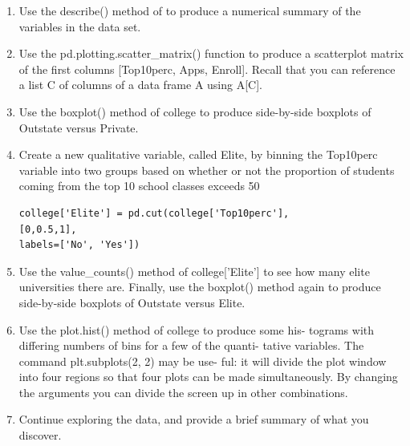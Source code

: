 \begin{exercise}[2.8]
\begin{enumerate}[label=(\alph*)]
		pandas to treat this as data. However, it may be handy to have
		these names for later. Try the following commands and similarly
		look at the resulting data frames:
		\begin{lstlisting}[language=Python]
college2 = pd.read_csv('College.csv', index_col=0)
college3 = college.rename({'Unnamed: 0': 'College'},
													axis=1)
college3 = college3.set_index('College')
	\end{lstlisting}		
This has used the first column in the file as an index for the
data frame. This means that pandas has given each row a name
corresponding to the appropriate university. Now you should see
that the first data column is Private. Note that the names of
the colleges appear on the left of the table. We also introduced
a new python object above: a dictionary, which is specified by dictionary
(key, value) pairs. Keep your modified version of the data with
the following:
\begin{lstlisting}
	college = college3
\end{lstlisting}

		\item Use the describe() method of to produce a numerical summary
		of the variables in the data set.
		\item Use the pd.plotting.scatter\_matrix() function to produce a
		scatterplot matrix of the first columns [Top10perc, Apps, Enroll].
		Recall that you can reference a list C of columns of a data frame
		A using A[C].
		\item Use the boxplot() method of college to produce side-by-side
		boxplots of Outstate versus Private.
		\item Create a new qualitative variable, called Elite, by binning the
		Top10perc variable into two groups based on whether or not the
		proportion of students coming from the top 10%
		school classes exceeds 50%
		\begin{lstlisting}
college['Elite'] = pd.cut(college['Top10perc'],
[0,0.5,1],
labels=['No', 'Yes'])
		\end{lstlisting}
		\item Use the value\_counts() method of college['Elite'] to see how
		many elite universities there are. Finally, use the boxplot() method
		again to produce side-by-side boxplots of Outstate versus Elite.
		\item Use the plot.hist() method of college to produce some his-
		tograms with differing numbers of bins for a few of the quanti-
		tative variables. The command plt.subplots(2, 2) may be use-
		ful: it will divide the plot window into four regions so that four
		plots can be made simultaneously. By changing the arguments
		you can divide the screen up in other combinations.
		\item Continue exploring the data, and provide a brief summary of
		what you discover.		
	\end{enumerate}		
	\end{exercise}

